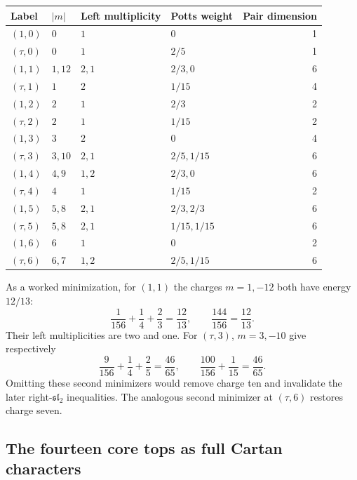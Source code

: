 \begin{longtable}{@{}llllr@{}}
\toprule
Label&$|m|$&Left multiplicity&Potts weight&Pair dimension\\
\midrule\endhead
$(1,0)$&$0$&$1$&$0$&1\\
$(\tau,0)$&$0$&$1$&$2/5$&1\\
$(1,1)$&$1,12$&$2,1$&$2/3,0$&6\\
$(\tau,1)$&$1$&$2$&$1/15$&4\\
$(1,2)$&$2$&$1$&$2/3$&2\\
$(\tau,2)$&$2$&$1$&$1/15$&2\\
$(1,3)$&$3$&$2$&$0$&4\\
$(\tau,3)$&$3,10$&$2,1$&$2/5,1/15$&6\\
$(1,4)$&$4,9$&$1,2$&$2/3,0$&6\\
$(\tau,4)$&$4$&$1$&$1/15$&2\\
$(1,5)$&$5,8$&$2,1$&$2/3,2/3$&6\\
$(\tau,5)$&$5,8$&$2,1$&$1/15,1/15$&6\\
$(1,6)$&$6$&$1$&$0$&2\\
$(\tau,6)$&$6,7$&$1,2$&$2/5,1/15$&6\\
\bottomrule
\end{longtable}

As a worked minimization, for $(1,1)$ the charges $m=1,-12$
both have energy $12/13$:
\[
 \frac1{156}+\frac14+\frac23=\frac{12}{13},
 \qquad \frac{144}{156}=\frac{12}{13}.
\]
Their left multiplicities are two and one. For $(\tau,3)$,
$m=3,-10$ give respectively
\[
 \frac9{156}+\frac14+\frac25=\frac{46}{65},
 \qquad \frac{100}{156}+\frac1{15}=\frac{46}{65}.
\]
Omitting these second minimizers would remove charge ten and
invalidate the later right-$\mathfrak{sl}_2$ inequalities.
The analogous second minimizer at $(\tau,6)$ restores charge
seven.

\subsection{The fourteen core tops as full Cartan characters}

